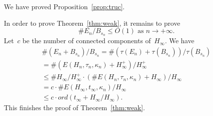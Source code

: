 \documentclass[12pt]{amsart}
\newcommand{\R}{{\mathbb R}}
\newcommand{\C}{{\mathbb C}}
\begin{document}
We have proved Proposition~\ref{prop:truc}. 

In order to prove Theorem~\ref{thm:weak}, it remains to prove
\[
\# E_n/B_{s_n}\leq O(1)\text{ as }n\to +\infty.
\]
Let~$c$ be the number of connected components of~$H_\infty$. We have
\begin{multline}
\# \left(E_n+B_{s_n}\right)/B_{s_n}
=\#\left(\tau(E_n)+\tau(B_{s_n})\right)/\tau(B_{s_n})\\
= \#\left(E(H_n,\tau_n,\kappa_n)+H^+_{\infty}\right)/H^+_{\infty}\\
\leq\#H_\infty/H_\infty^+\cdot \left(\#E(H_n,\tau_n,\kappa_n)+H_{\infty}\right)/H_{\infty}\\
=c\cdot \#E(H_\infty,t_\infty,\kappa_n)/H_{\infty}\\\leq c\cdot ord(t_\infty+H_{\infty}/H_{\infty}).
\end{multline}
This finishes the proof of Theorem~\ref{thm:weak}.
%
%
% 
%
%
%
%
\end{document}
